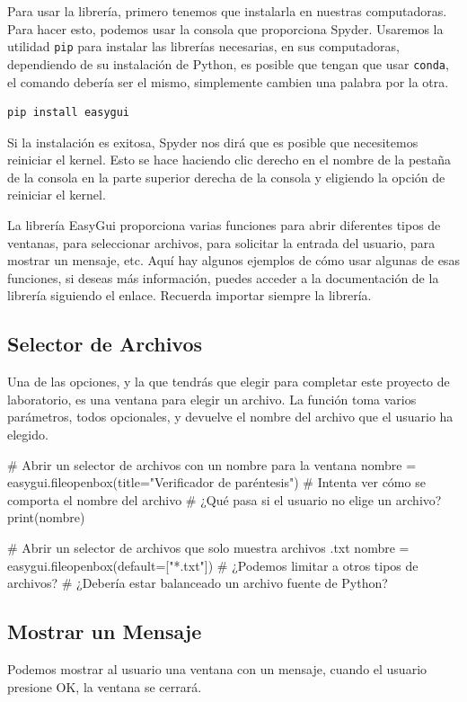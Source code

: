 \documentclass[10pt,a4paper]{article}
\begin{document}
Para usar la librería, primero tenemos que instalarla en nuestras computadoras. Para hacer esto, podemos usar la consola que proporciona Spyder. Usaremos la utilidad \lstinline|pip| para instalar las librerías necesarias, en sus computadoras, dependiendo de su instalación de Python, es posible que tengan que usar \lstinline|conda|, el comando debería ser el mismo, simplemente cambien una palabra por la otra.

\begin{lstlisting}
pip install easygui
\end{lstlisting}

Si la instalación es exitosa, Spyder nos dirá que es posible que necesitemos reiniciar el kernel. Esto se hace haciendo clic derecho en el nombre de la pestaña de la consola en la parte superior derecha de la consola y eligiendo la opción de reiniciar el kernel.

La librería EasyGui proporciona varias funciones para abrir diferentes tipos de ventanas, para seleccionar archivos, para solicitar la entrada del usuario, para mostrar un mensaje, etc. Aquí hay algunos ejemplos de cómo usar algunas de esas funciones, si deseas más información, puedes acceder a la documentación de la librería siguiendo el enlace. Recuerda importar siempre la librería.

\subsection{Selector de Archivos}
Una de las opciones, y la que tendrás que elegir para completar este proyecto de laboratorio, es una ventana para elegir un archivo. La función toma varios parámetros, todos opcionales, y devuelve el nombre del archivo que el usuario ha elegido.

\begin{attachedlisting}[open]
# Abrir un selector de archivos con un nombre para la ventana
nombre = easygui.fileopenbox(title="Verificador de paréntesis")
# Intenta ver cómo se comporta el nombre del archivo
# ¿Qué pasa si el usuario no elige un archivo?
print(nombre)

# Abrir un selector de archivos que solo muestra archivos .txt
nombre = easygui.fileopenbox(default=["*.txt"])
# ¿Podemos limitar a otros tipos de archivos?
# ¿Debería estar balanceado un archivo fuente de Python?
\end{attachedlisting}

\subsection{Mostrar un Mensaje}
Podemos mostrar al usuario una ventana con un mensaje, cuando el usuario presione OK, la ventana se cerrará.
\end{document}
